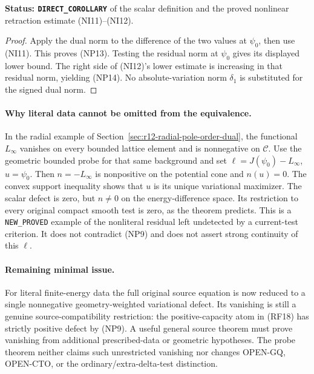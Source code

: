 \documentclass[11pt,a4paper]{article}
\numberwithin{equation}{section}
\theoremstyle{definition}
\theoremstyle{remark}
\begin{document}
\noindent\textbf{Status: \texttt{DIRECT\_COROLLARY}}
of the scalar definition and the proved nonlinear
retraction estimate \textup{(NI11)--(NI12)}.

\begin{proof}
Apply the dual norm to the difference of the two
values at $\psi_0$, then use \textup{(NI11)}.
This proves \textup{(NP13)}.  Testing the residual
norm at $\psi_0$ gives its displayed lower bound.
The right side of \textup{(NI12)}'s lower estimate
is increasing in that residual norm, yielding
\textup{(NP14)}.  No absolute-variation norm
$\delta_1$ is substituted for the signed dual norm.
\end{proof}

\paragraph{Why literal data cannot be omitted from the equivalence.}
In the radial example of Section~\ref{sec:r12-radial-pole-order-dual},
the functional $L_\infty$ vanishes on every bounded
lattice element and is nonnegative on $\mathscr C$.
Use the geometric bounded probe for that same background
and set $\ell=J(\psi_0)-L_\infty$, $u=\psi_0$.
Then $n=-L_\infty$ is nonpositive on the potential
cone and $n(u)=0$.  The convex support inequality
shows that $u$ is its unique variational maximizer.
The scalar defect is zero, but $n\ne0$ on the
energy-difference space.  Its restriction to every
original compact smooth test is zero, as the theorem
predicts.  This is a \texttt{NEW\_PROVED} example
of the nonliteral residual left undetected by a
current-test criterion.  It does not contradict
\textup{(NP9)} and does not assert strong continuity
of this $\ell$.

\paragraph{Remaining minimal issue.}
For literal finite-energy data the full original source
equation is now reduced to a single nonnegative
geometry-weighted variational defect.  Its vanishing
is still a genuine source-compatibility restriction:
the positive-capacity atom in \textup{(RF18)} has
strictly positive defect by \textup{(NP9)}.  A useful
general source theorem must prove vanishing from
additional prescribed-data or geometric hypotheses.
The probe theorem neither claims such unrestricted
vanishing nor changes OPEN-GQ, OPEN-CTO, or the
ordinary/extra-delta-test distinction.

\end{document}
